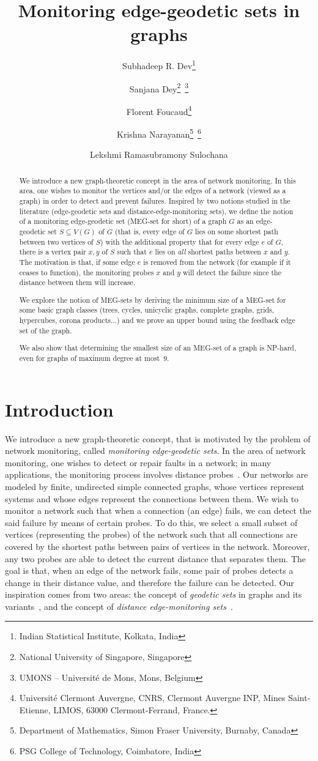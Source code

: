 \documentclass[10pt,a4paper]{article}
\title{Monitoring edge-geodetic sets in graphs}
\author{
Subhadeep R. Dev\footnote{Indian Statistical Institute, Kolkata, India}
\and Sanjana Dey\footnote{National University of Singapore, Singapore}~\footnote{\noindent UMONS -- Université de Mons, Mons, Belgium}
\and Florent Foucaud\footnote{Université Clermont Auvergne, CNRS, Clermont Auvergne INP, Mines Saint-Etienne, LIMOS, 63000 Clermont-Ferrand, France.} \and Krishna Narayanan\footnote{\noindent Department of Mathematics, Simon Fraser University, Burnaby, Canada}~\footnote{\noindent PSG College of Technology, Coimbatore, India}
\and Lekshmi Ramasubramony Sulochana \footnotemark[6]}
\begin{document}
\maketitle

\begin{abstract}
We introduce a new graph-theoretic concept in the area of network monitoring. In this area, one wishes to monitor the vertices and/or the edges of a network (viewed as a graph) in order to detect and prevent failures. Inspired by two notions studied in the literature (edge-geodetic sets and distance-edge-monitoring sets), we define the notion of a monitoring edge-geodetic set (MEG-set for short) of a graph $G$ as an edge-geodetic set $S\subseteq V(G)$ of $G$ (that is, every edge of $G$ lies on some shortest path between two vertices of $S$) with the additional property that for every edge $e$ of $G$, there is a vertex pair $x, y$ of $S$ such that $e$ lies on \emph{all} shortest paths between $x$ and $y$. The motivation is that, if some edge $e$ is removed from the network (for example if it ceases to function), the monitoring probes $x$ and $y$ will detect the failure since the distance between them will increase.

We explore the notion of MEG-sets by deriving the minimum size of a MEG-set for some basic graph classes (trees, cycles, unicyclic graphs, complete graphs, grids, hypercubes, corona products...) and we prove an upper bound using the feedback edge set of the graph.

We also show that determining the smallest size of an MEG-set of a graph is NP-hard, even for graphs of maximum degree at most~9.
\end{abstract}


\section{Introduction}
We introduce a new graph-theoretic concept, that is motivated by the problem of network monitoring, called \emph{monitoring edge-geodetic sets}. In the area of network monitoring, one wishes to detect or repair faults in a network; in many applications, the monitoring process involves distance probes~\cite{r2,BEEHHMR06,BR06,r1j}. Our networks are modeled by finite, undirected simple connected graphs, whose vertices represent systems and whose edges represent the connections between them. We wish to monitor a network such that when a connection (an edge) fails, we can detect the said failure by means of certain probes. To do this, we select a small subset of vertices (representing the probes) of the network such that all connections are covered by the shortest paths between pairs of vertices in the network. Moreover, any two probes are able to detect the current distance that separates them. The goal is that, when an edge of the network fails, some pair of probes detects a change in their distance value, and therefore the failure can be detected. Our inspiration comes from two areas: the concept of \emph{geodetic sets} in graphs and its variants~\cite{r4}, and the concept of \emph{distance edge-monitoring sets}~\cite{r1,r1j}.
\end{document}
